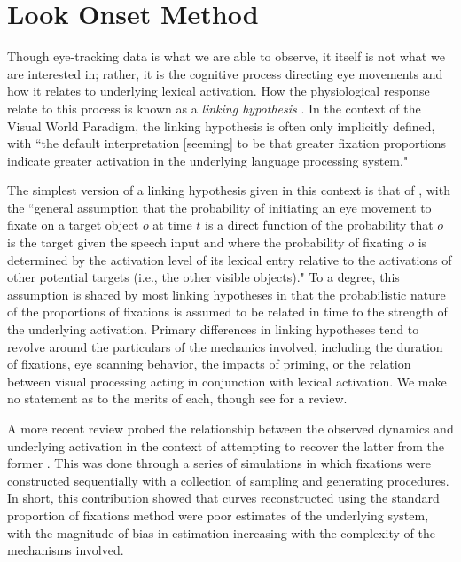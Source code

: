 \section{Look Onset Method}

Though eye-tracking data is what we are able to observe, it itself is not what we are interested in; rather, it is the cognitive process directing eye movements and how it relates to underlying lexical activation. How the physiological response relate to this process is known as a \textit{linking hypothesis} \cite{Magnuson2019}. In the context of the Visual World Paradigm, the linking hypothesis is often only implicitly defined, with ``the default interpretation [seeming] to be that greater fixation proportions indicate greater activation in the underlying language processing system." 

The simplest version of a linking hypothesis given in this context is that of \cite{allopenna1998tracking}, with  the ``general assumption that the probability of initiating an eye movement to fixate on a target object $o$ at time $t$ is a direct function of the probability that $o$ is the target given the speech input and where the probability of fixating $o$ is determined by the activation level of its lexical entry relative to the activations of other potential targets (i.e., the other visible objects)." To a degree, this assumption is shared by most linking hypotheses in that the probabilistic nature of the proportions of fixations is assumed to be related in time to the strength of the underlying activation. Primary differences in linking hypotheses tend to revolve around the particulars of the mechanics involved, including the duration of fixations, eye scanning behavior, the impacts of priming, or the relation between visual  processing acting in conjunction with lexical activation. We make no statement as to the merits of each, though see \cite{Magnuson2019} for a review.

A more recent review probed the relationship between the observed dynamics and underlying activation in the context of attempting to recover the latter from the former \cite{mcmurray2022m}. This was done through a series of simulations in which fixations were constructed sequentially with a collection of sampling and generating procedures. In short, this contribution showed that curves reconstructed using the standard proportion of fixations method were poor estimates of the underlying system, with the magnitude of bias in estimation increasing with the complexity of the mechanisms involved.

